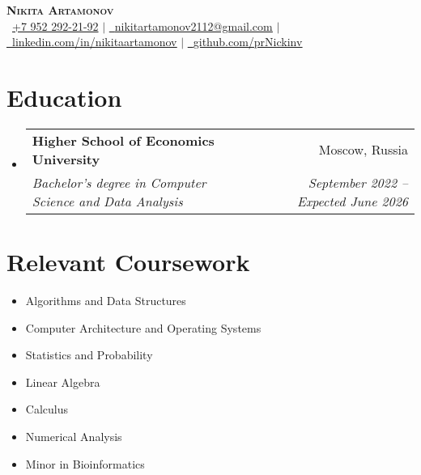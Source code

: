 \documentclass[letterpaper,11pt]{article}
\makeatletter
\newcommand{\resumeSubheading}[4]{
  \vspace{-2pt}\item
    \begin{tabular*}{0.97\textwidth}[t]{l@{\extracolsep{\fill}}r}
      \textbf{#1} & #2 \\
      \textit{\small#3} & \textit{\small #4} \\
    \end{tabular*}\vspace{-7pt}
}
\newcommand{\resumeSubHeadingListStart}{\begin{itemize}[leftmargin=0.15in, label={}]}
\newcommand{\resumeSubHeadingListEnd}{\end{itemize}}
\makeatother
\begin{document}

\begin{center}
    \textbf{\Huge \scshape Nikita Artamonov} \\ \vspace{1pt}
    \small \faMobile\ \underline{+7 952 292-21-92} $|$ \href{mailto:nikitartamonov2112@gmail.com}{\raisebox{-0.2\height}\faEnvelope\ \underline{nikitartamonov2112@gmail.com}} $|$ 
    \href{https://www.linkedin.com/in/nikitaartamonov/}{\raisebox{-0.2\height}\faLinkedin\ \underline{linkedin.com/in/nikitaartamonov}} $|$
    \href{https://github.com/prNickinv}{\raisebox{-0.2\height}\faGithub\ \underline{github.com/prNickinv}}
\end{center}


\section{Education}
  \resumeSubHeadingListStart
    \resumeSubheading
      {Higher School of Economics University }{Moscow, Russia}
      {Bachelor’s degree in Computer Science and Data Analysis}{September 2022 -- Expected June 2026}
  \resumeSubHeadingListEnd


\section{Relevant Coursework}
    \begin{multicols}{2}
        \begin{itemize}
            \item Algorithms and Data Structures
            \item Computer Architecture and Operating Systems
            \item Statistics and Probability
            \item Linear Algebra
            \item Calculus
            \item Numerical Analysis
            \item Minor in Bioinformatics
        \end{itemize}
    \end{multicols}
 
\end{document}
